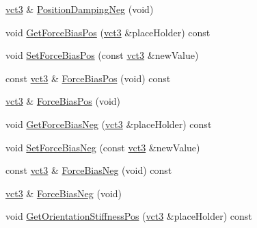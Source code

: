 \begin{DoxyCompactItemize}
\item 
\hyperlink{vct_fixed_size_vector_types_8h_a3af82acdbf4eeb73c551909240b106ea}{vct3} \& \hyperlink{classprm_fixture_gain_cartesian_set_a3a3ebb2a16947f56ad50db0d6af063f3}{Position\-Damping\-Neg} (void)
\item 
void \hyperlink{classprm_fixture_gain_cartesian_set_ab11083c6848ba90b159a739fdfac72b1}{Get\-Force\-Bias\-Pos} (\hyperlink{vct_fixed_size_vector_types_8h_a3af82acdbf4eeb73c551909240b106ea}{vct3} \&place\-Holder) const 
\item 
void \hyperlink{classprm_fixture_gain_cartesian_set_abf7d6bcc6844c481f404c888eb4f5e5f}{Set\-Force\-Bias\-Pos} (const \hyperlink{vct_fixed_size_vector_types_8h_a3af82acdbf4eeb73c551909240b106ea}{vct3} \&new\-Value)
\item 
const \hyperlink{vct_fixed_size_vector_types_8h_a3af82acdbf4eeb73c551909240b106ea}{vct3} \& \hyperlink{classprm_fixture_gain_cartesian_set_a94d1360aa5a1c8d50d68e6a81da03973}{Force\-Bias\-Pos} (void) const 
\item 
\hyperlink{vct_fixed_size_vector_types_8h_a3af82acdbf4eeb73c551909240b106ea}{vct3} \& \hyperlink{classprm_fixture_gain_cartesian_set_aa15cc6eccda107752045b8e9f6a18546}{Force\-Bias\-Pos} (void)
\item 
void \hyperlink{classprm_fixture_gain_cartesian_set_a71c4adab5e13233f949d92e898f4dfc2}{Get\-Force\-Bias\-Neg} (\hyperlink{vct_fixed_size_vector_types_8h_a3af82acdbf4eeb73c551909240b106ea}{vct3} \&place\-Holder) const 
\item 
void \hyperlink{classprm_fixture_gain_cartesian_set_a7325f4463fa04eb9168cf38b420aeb7b}{Set\-Force\-Bias\-Neg} (const \hyperlink{vct_fixed_size_vector_types_8h_a3af82acdbf4eeb73c551909240b106ea}{vct3} \&new\-Value)
\item 
const \hyperlink{vct_fixed_size_vector_types_8h_a3af82acdbf4eeb73c551909240b106ea}{vct3} \& \hyperlink{classprm_fixture_gain_cartesian_set_aff9b220c49351366efc0374f595f5387}{Force\-Bias\-Neg} (void) const 
\item 
\hyperlink{vct_fixed_size_vector_types_8h_a3af82acdbf4eeb73c551909240b106ea}{vct3} \& \hyperlink{classprm_fixture_gain_cartesian_set_a8930b57591501d067f307effdc1cd152}{Force\-Bias\-Neg} (void)
\item 
void \hyperlink{classprm_fixture_gain_cartesian_set_ad860237303f50647631cea53fc339001}{Get\-Orientation\-Stiffness\-Pos} (\hyperlink{vct_fixed_size_vector_types_8h_a3af82acdbf4eeb73c551909240b106ea}{vct3} \&place\-Holder) const 
\item 

\end{DoxyCompactItemize}
